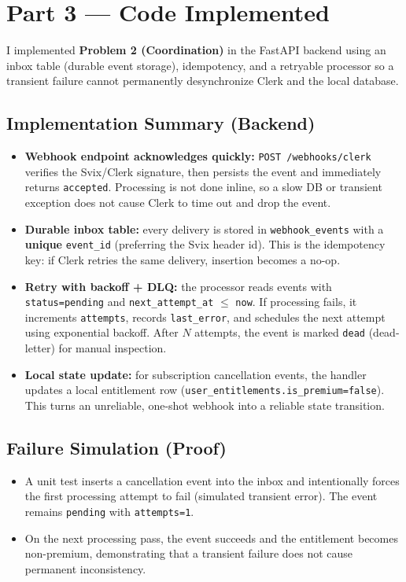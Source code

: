 \documentclass[11pt]{article}
\begin{document}
\section*{Part 3 --- Code Implemented}
I implemented \textbf{Problem 2 (Coordination)} in the FastAPI backend using an inbox table (durable event storage),
idempotency, and a retryable processor so a transient failure cannot permanently desynchronize Clerk and the local database.

\subsection*{Implementation Summary (Backend)}
\begin{itemize}
  \item \textbf{Webhook endpoint acknowledges quickly:} \texttt{POST /webhooks/clerk} verifies the Svix/Clerk signature,
  then persists the event and immediately returns \texttt{accepted}. Processing is not done inline, so a slow DB or transient
  exception does not cause Clerk to time out and drop the event.

  \item \textbf{Durable inbox table:} every delivery is stored in \texttt{webhook\_events} with a \textbf{unique} \texttt{event\_id}
  (preferring the Svix header id). This is the idempotency key: if Clerk retries the same delivery, insertion becomes a no-op.

  \item \textbf{Retry with backoff + DLQ:} the processor reads events with \texttt{status=pending} and
  \texttt{next\_attempt\_at} $\leq$ \texttt{now}.
  If processing fails, it increments \texttt{attempts}, records \texttt{last\_error}, and schedules the next attempt using exponential backoff.
  After $N$ attempts, the event is marked \texttt{dead} (dead-letter) for manual inspection.

  \item \textbf{Local state update:} for subscription cancellation events, the handler updates a local entitlement row
  (\texttt{user\_entitlements.is\_premium=false}). This turns an unreliable, one-shot webhook into a reliable state transition.
\end{itemize}

\subsection*{Failure Simulation (Proof)}
\begin{itemize}
  \item A unit test inserts a cancellation event into the inbox and intentionally forces the first processing attempt to fail
  (simulated transient error). The event remains \texttt{pending} with \texttt{attempts=1}.
  \item On the next processing pass, the event succeeds and the entitlement becomes non-premium, demonstrating that a transient failure
  does not cause permanent inconsistency.
\end{itemize}
\end{document}
